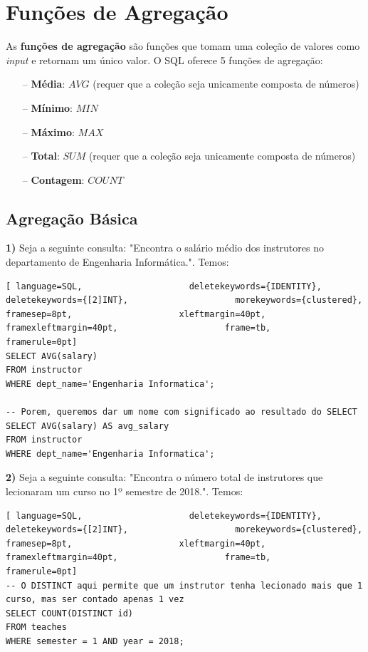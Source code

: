 \documentclass[oneside]{book}
\theoremstyle{definition}
\begin{document}
\section{Funções de Agregação}
As \textbf{funções de agregação} são funções que tomam uma coleção de valores como \textit{input} e retornam um único valor. O SQL oferece 5 funções de agregação:
\begin{itemize}
    \itemsep0cm
    \item[--]\textbf{Média}: $AVG$ (requer que a coleção seja unicamente composta de números)
    \item[--]\textbf{Mínimo}: $MIN$
    \item[--]\textbf{Máximo}: $MAX$
    \item[--]\textbf{Total}: $SUM$ (requer que a coleção seja unicamente composta de números)
    \item[--]\textbf{Contagem}: $COUNT$
\end{itemize}

\subsection{Agregação Básica}
\textbf{1)} Seja a seguinte consulta: "Encontra o salário médio dos instrutores no departamento de Engenharia Informática.". Temos:
\begin{lstlisting}[ language=SQL,                     deletekeywords={IDENTITY},                     deletekeywords={[2]INT},                     morekeywords={clustered},                     framesep=8pt,                     xleftmargin=40pt,                     framexleftmargin=40pt,                     frame=tb,                     framerule=0pt]
SELECT AVG(salary)
FROM instructor
WHERE dept_name='Engenharia Informatica';

-- Porem, queremos dar um nome com significado ao resultado do SELECT
SELECT AVG(salary) AS avg_salary
FROM instructor
WHERE dept_name='Engenharia Informatica';
\end{lstlisting}

\textbf{2)} Seja a seguinte consulta: "Encontra o número total de instrutores que lecionaram um curso no 1º semestre de 2018.". Temos:
\begin{lstlisting}[ language=SQL,                     deletekeywords={IDENTITY},                     deletekeywords={[2]INT},                     morekeywords={clustered},                     framesep=8pt,                     xleftmargin=40pt,                     framexleftmargin=40pt,                     frame=tb,                     framerule=0pt]
-- O DISTINCT aqui permite que um instrutor tenha lecionado mais que 1 curso, mas ser contado apenas 1 vez
SELECT COUNT(DISTINCT id)
FROM teaches
WHERE semester = 1 AND year = 2018;
\end{lstlisting}
\end{document}
